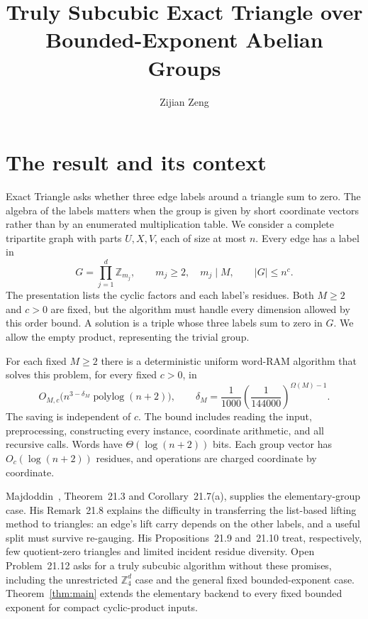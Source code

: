 \documentclass[manuscript,screen,nonacm,11pt]{acmart}
\title{Truly Subcubic Exact Triangle over Bounded-Exponent Abelian Groups}
\author{Zijian Zeng}
\affiliation{\institution{UCSI University}\country{Malaysia}}
\newcommand{\Z}{\mathbb Z}
\newcommand{\Om}{\Omega}
\begin{document}
\maketitle
\clearpage

\section{The result and its context}

Exact Triangle asks whether three edge labels around a triangle sum to zero.
The algebra of the labels matters when the group is given by short coordinate
vectors rather than by an enumerated multiplication table. We consider a
complete tripartite graph with parts $U,X,V$, each of size at most $n$.
Every edge has a label in
\[
 G=\prod_{j=1}^d\Z_{m_j},\qquad m_j\ge2,\quad m_j\mid M,
 \qquad |G|\le n^c.
\]
The presentation lists the cyclic factors and each label's residues. Both
$M\ge2$ and $c>0$ are fixed, but the algorithm must handle every dimension
allowed by this order bound. A solution is a triple whose three labels sum
to zero in $G$. We allow the empty product, representing the trivial group.

\begin{theorem}\label{thm:main}
For each fixed $M\ge2$ there is a deterministic uniform word-RAM algorithm
that solves this problem, for every fixed $c>0$, in
\[
 O_{M,c}\bigl(n^{3-\delta_M}\operatorname{polylog}(n+2)\bigr),
 \qquad
 \delta_M=\frac1{1000}\left(\frac1{144000}\right)^{\Om(M)-1}.
\]
The saving is independent of $c$. The bound includes reading the input,
preprocessing, constructing every instance, coordinate arithmetic, and all
recursive calls. Words have $\Theta(\log(n+2))$ bits. Each group vector has
$O_c(\log(n+2))$ residues, and operations are charged coordinate by
coordinate.
\end{theorem}

Majdoddin~\cite{Maj26}, Theorem~21.3 and Corollary~21.7(a), supplies the
elementary-group case. His Remark~21.8 explains the difficulty in transferring
the list-based lifting method to triangles: an edge's lift carry depends on
the other labels, and a useful split must survive re-gauging. His
Propositions~21.9 and~21.10 treat, respectively, few quotient-zero triangles
and limited incident residue diversity. Open Problem~21.12 asks for a truly
subcubic algorithm without these promises, including the unrestricted
$\Z_4^d$ case and the general fixed bounded-exponent case. Theorem~\ref{thm:main}
extends the elementary backend to every fixed bounded exponent for compact
cyclic-product inputs.
\end{document}
